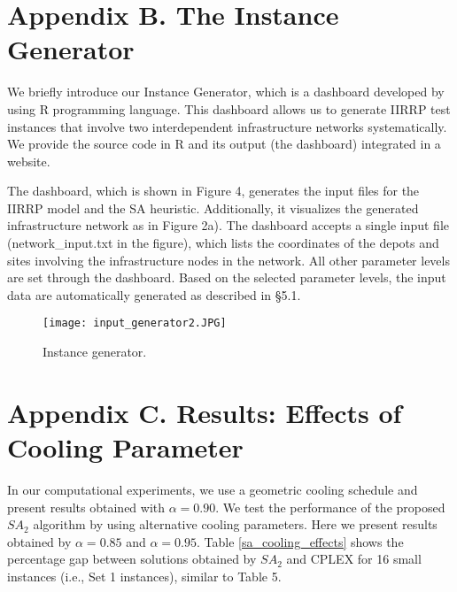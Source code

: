 \documentclass[11pt]{article}
\begin{document}
\newpage
\section*{Appendix B. The Instance Generator} \label{s:appC}
We briefly introduce our Instance Generator, which is a dashboard developed by using R programming language. This dashboard allows us to generate IIRRP test instances that involve two interdependent infrastructure networks systematically. We provide the source code in R and its output (the dashboard) integrated in a website. 

The dashboard, which is shown in Figure 4, generates the input files for the IIRRP model and the SA heuristic. Additionally, it visualizes the generated infrastructure network as in Figure 2a). The dashboard accepts a single input file (network\_input.txt in the figure), which lists the coordinates of the depots and sites involving the infrastructure nodes in the network. All other parameter levels are set through the dashboard.  Based on the selected parameter levels, the input data are automatically generated as described in \S 5.1.



\begin{figure}[http!]
	\centering
	\texttt{[image: input\_generator2.JPG]} \hfill
	\caption{Instance generator.}
\end{figure}



\newpage
\section*{Appendix C. Results: Effects of Cooling Parameter} \label{s:appD}
In our computational experiments, we use a geometric cooling schedule and present results obtained with $\alpha=0.90$. We test the performance of the proposed $SA_2$ algorithm by using alternative cooling parameters. Here we present results obtained by $\alpha=0.85$ and $\alpha=0.95$. Table \ref{sa_cooling_effects} shows the percentage gap between solutions obtained by $SA_2$ and CPLEX for 16 small instances (i.e., Set 1 instances), similar to Table 5.
\end{document}
